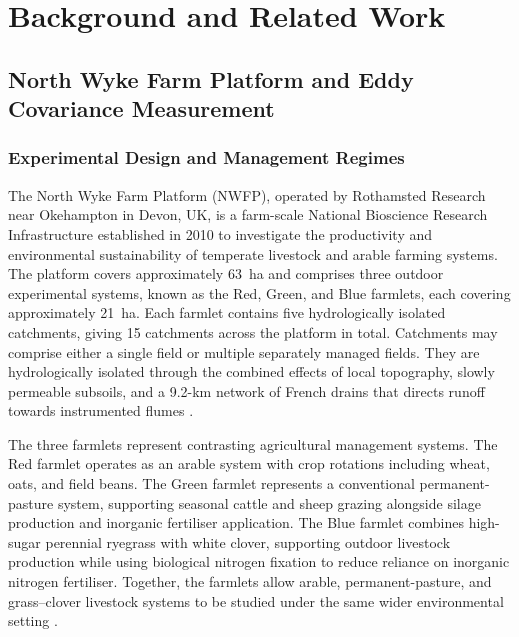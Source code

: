 \chapter{Background and Related Work} \label{Chap2}

\section{North Wyke Farm Platform and Eddy Covariance Measurement}

\subsection{Experimental Design and Management Regimes}

The North Wyke Farm Platform (NWFP), operated by Rothamsted Research near
Okehampton in Devon, UK, is a farm-scale National Bioscience Research
Infrastructure established in 2010 to investigate the productivity and
environmental sustainability of temperate livestock and arable farming
systems. The platform covers approximately 63~ha and comprises three outdoor
experimental systems, known as the Red, Green, and Blue farmlets, each
covering approximately 21~ha. Each farmlet contains five hydrologically
isolated catchments, giving 15 catchments across the platform in total.
Catchments may comprise either a single field or multiple separately managed
fields. They are hydrologically isolated through the combined effects of local
topography, slowly permeable subsoils, and a 9.2-km network of French drains
that directs runoff towards instrumented flumes
\cite{hawkins2023design,hawkins2025}.

The three farmlets represent contrasting agricultural management systems. The Red farmlet operates 
as an arable system with crop rotations including wheat, oats, and field beans. The Green farmlet 
represents a conventional permanent-pasture system, supporting seasonal cattle and sheep grazing 
alongside silage production and inorganic fertiliser application. The Blue farmlet combines high-sugar 
perennial ryegrass with white clover, supporting outdoor livestock production while using biological 
nitrogen fixation to reduce reliance on inorganic nitrogen fertiliser. Together, the farmlets allow 
arable, permanent-pasture, and grass--clover livestock systems to be studied under the same wider 
environmental setting \cite{hawkins2023design,hawkins2023fieldevents}.

